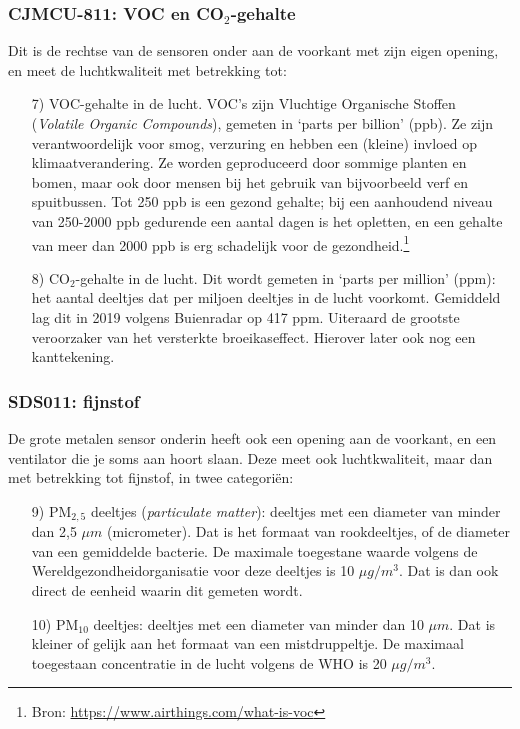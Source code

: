 \documentclass[a4paper,11pt, fleqn]{article}
\begin{document}
\subsubsection{CJMCU-811: VOC en CO$_2$-gehalte}
Dit is de rechtse van de sensoren onder aan de voorkant met zijn eigen opening, en meet de luchtkwaliteit met betrekking tot:
\begin{itemize}
	\item[7)] VOC-gehalte in de lucht. VOC's zijn Vluchtige Organische Stoffen ({\it Volatile Organic Compounds}), gemeten in `parts per billion' (ppb). Ze zijn verantwoordelijk voor smog, verzuring en hebben een (kleine) invloed op klimaatverandering. Ze worden geproduceerd door sommige planten en bomen, maar ook door mensen bij het gebruik van bijvoorbeeld verf en spuitbussen. Tot 250 ppb is een gezond gehalte; bij een aanhoudend niveau van 250-2000 ppb gedurende een aantal dagen is het opletten, en een gehalte van meer dan 2000 ppb is erg schadelijk voor de gezondheid.\footnote{Bron: \href{https://www.airthings.com/what-is-voc}{https://www.airthings.com/what-is-voc}}
	\item[8)] CO$_2$-gehalte in de lucht. Dit wordt gemeten in `parts per million' (ppm): het aantal deeltjes dat per miljoen deeltjes in de lucht voorkomt. Gemiddeld lag dit in 2019 volgens Buienradar op 417 ppm. Uiteraard de grootste veroorzaker van het versterkte broeikaseffect. Hierover later ook nog een kanttekening.
\end{itemize}

\subsubsection{SDS011: fijnstof}
De grote metalen sensor onderin heeft ook een opening aan de voorkant, en een ventilator die je soms aan hoort slaan. Deze meet ook luchtkwaliteit, maar dan met betrekking tot fijnstof, in twee categori\"en:
\begin{itemize}
	\item[9)] PM$_{2,5}$ deeltjes ({\it particulate matter}): deeltjes met een diameter van minder dan 2,5 $\mu m$ (micrometer). Dat is het formaat van rookdeeltjes, of de diameter van een gemiddelde bacterie. De maximale toegestane waarde volgens de Wereldgezondheidorganisatie voor deze deeltjes is 10 $\mu g/m^3$. Dat is dan ook direct de eenheid waarin dit gemeten wordt.
	\item[10)] PM$_{10}$ deeltjes: deeltjes met een diameter van minder dan 10 $\mu m$. Dat is kleiner of gelijk aan het formaat van een mistdruppeltje. De maximaal toegestaan concentratie in de lucht volgens de WHO is 20 $\mu g/m^3$. 
\end{itemize}
\end{document}

